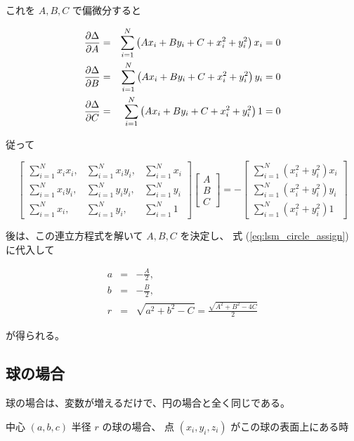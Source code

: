 \documentclass[12pt]{jsarticle}
\def\sumdata{\sum_{i=1}^{N}}
\begin{document}
これを $A, B, C$ で偏微分すると

\begin{eqnarray}
  \partd{\Delta}{A} &=&
  \sumdata \left(A x_i + B y_i + C + x_i^2 + y_i^2 \right)
  x_i = 0 \nonumber \\
  \partd{\Delta}{B} &=&
  \sumdata \left(A x_i + B y_i + C + x_i^2 + y_i^2 \right)
  y_i = 0 \nonumber \\
  \partd{\Delta}{C} &=&
  \sumdata \left(A x_i + B y_i + C + x_i^2 + y_i^2 \right)
  1 = 0
\end{eqnarray}

従って

\begin{equation}
  \begin{bmatrix}
    \sumdata x_i x_i, & \sumdata x_i y_i, & \sumdata x_i \\
    \sumdata x_i y_i, & \sumdata y_i y_i, & \sumdata y_i \\
    \sumdata x_i,     & \sumdata y_i,     & \sumdata 1
  \end{bmatrix}
  \begin{bmatrix}
    A \\ B \\ C
  \end{bmatrix}
  = -
  \begin{bmatrix}
    \sumdata \left( x_i^2 + y_i^2 \right) x_i \\
    \sumdata \left( x_i^2 + y_i^2 \right) y_i \\
    \sumdata \left( x_i^2 + y_i^2 \right) 1
  \end{bmatrix}
\end{equation}

後は、この連立方程式を解いて $A, B, C$ を決定し、
式 (\ref{eq:lsm_circle_assign}) に代入して

\begin{eqnarray}
  a &=& - \frac{A}{2}, \\
  b &=& - \frac{B}{2}, \\
  r &=& \sqrt{a^2 + b^2 - C} = \frac{\sqrt{A^2 + B^2 - 4C}}{2}
\end{eqnarray}

が得られる。

\subsection{球の場合}

球の場合は、変数が増えるだけで、円の場合と全く同じである。

中心 $(a, b, c)$ 半径 $r$ の球の場合、
点 $(x_i, y_i, z_i)$ がこの球の表面上にある時
\end{document}
